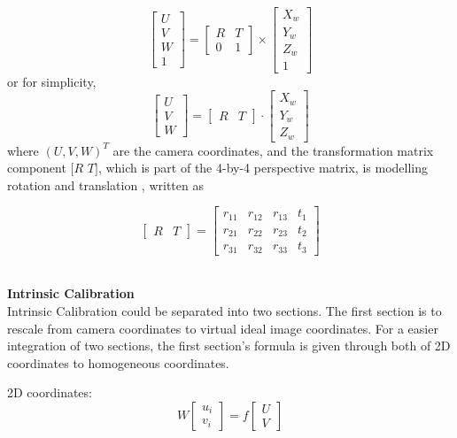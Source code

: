 \begin{equation}
%
\left[ \begin{array}{c} U \\ V \\ W \\ 1 \end{array} \right] %
= %
\begin{bmatrix} R & T \\ 0 & 1 \end{bmatrix} \times \left[ \begin{array}{c} X_w \\ Y_w \\ Z_w \\ 1 \end{array} \right]
%
\end{equation}%
%
or for simplicity,
\begin{equation}
%
\left[ \begin{array}{c} U \\ V \\ W \end{array} \right] %
= %
\begin{bmatrix} R & T \end{bmatrix} \cdot \left[ \begin{array}{c} X_w \\ Y_w \\ Z_w \end{array} \right]
\label{extrinsicTransform}
%
\end{equation}%
%
where \((U, V, W)^T\) are the camera coordinates, and the transformation matrix component \([R\)  \(T]\), which is part of the 4-by-4 perspective matrix, is modelling rotation and translation , written as

\begin{equation}
%
\left[ \begin{array}{cc} R & T \end{array} \right] %
= %
\begin{bmatrix}
 r_{11} & r_{12} & r_{13} & t_1 \\
 r_{21} & r_{22} & r_{23} & t_2 \\
 r_{31} & r_{32} & r_{33} & t_3
\end{bmatrix}
%
\end{equation}
\\\par
%
%
\textbf{Intrinsic Calibration}\\
Intrinsic Calibration could be separated into two sections. The first section is to rescale from camera coordinates to virtual ideal image coordinates. For a easier integration of two sections, the first section's formula is given through both of 2D coordinates to homogeneous coordinates.\par
%
\quad\quad2D coordinates:%
\begin{equation}
%
W \left[ \begin{array}{c} u_i \\ v_i  \end{array} \right] %
= f %
\left[ \begin{array}{c} U \\ V \end{array} \right]%
%
\end{equation}

